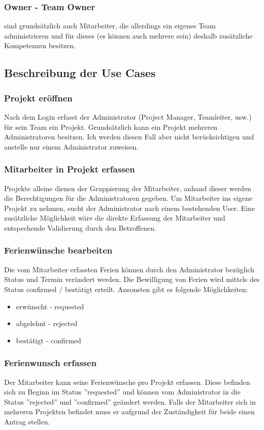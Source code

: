 \subsubsection{Owner - Team Owner} sind grunds\"atzlich auch Mitarbeiter, die allerdings ein eigenes Team administrieren und f\"ur dieses (es k\"onnen auch mehrere sein) deshalb zus\"atzliche Kompetenzen besitzen.

\subsection{Beschreibung der Use Cases}
\subsubsection{Projekt er\"offnen}
Nach dem Login erfasst der Administrator (Project Manager, Teamleiter, usw.) f\"ur sein Team ein Projekt. Grunds\"atzlich kann ein Projekt mehreren Administratoren besitzen. Ich werden diesen Fall aber nicht ber\"ucksichtigen und anstelle nur einem Administrator zuweisen.
\subsubsection{Mitarbeiter in Projekt erfassen}
Projekte alleine dienen der Gruppierung der Mitarbeiter, anhand dieser werden die Berechtigungen f\"ur die Administratoren gegeben. Um Mitarbeiter ins eigene Projekt zu nehmen, sucht der Administrator nach einem bestehenden User. Eine zus\"atzliche M\"oglichkeit w\"are die direkte Erfassung der Mitarbeiter und entspechende Validierung durch den Betroffenen.
\subsubsection{Ferienw\"unsche bearbeiten}
Die vom Mitarbeiter erfassten Ferien k\"onnen durch den Administrator bez\"uglich Status und Termin ver\"andert werden. Die Bewilligung von Ferien wird mittels des Status confirmed / best\"atigt erteilt. Ansonsten gibt es folgende M\"oglichkeiten:
\begin{itemize}
\item erw\"unscht - requested
\item abgelehnt - rejected
\item best\"atigt - confirmed
\end{itemize}

\subsubsection{Ferienwunsch erfassen}
Der Mitarbeiter kann seine Ferienw\"unsche pro Projekt erfassen. Diese befinden sich zu Beginn im Status ''requested'' und k\"onnen vom Administrator in die Status ''rejected'' und ''confirmed'' ge\"andert werden. Falls der Mitarbeiter sich in mehreren Projekten befindet muss er aufgrund der Zust\"andigkeit f\"ur beide einen Antrag stellen.

